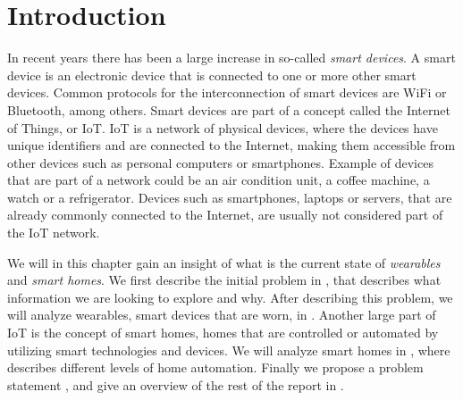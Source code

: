 \chapter{Introduction}\label{chap:introduction}
In recent years there has been a large increase in so-called \emph{smart devices}. 
A smart device is an electronic device that is connected to one or more other smart devices. 
Common protocols for the interconnection of smart devices are WiFi or Bluetooth, among others.
Smart devices are part of a concept called the Internet of Things, or IoT. 
IoT is a network of physical devices, 
where the devices have unique identifiers and are connected to the Internet, 
making them accessible from other devices such as personal computers or smartphones. 
Example of devices that are part of a network could be an air condition unit, a coffee machine, a watch or a refrigerator. 
Devices such as smartphones, laptops or servers, 
that are already commonly connected to the Internet, 
are usually not considered part of the IoT network. 

We will in this chapter gain an insight of what is the current state of \emph{wearables} and \emph{smart homes}. 
We first describe the initial problem in , 
that describes what information we are looking to explore and why. 
After describing this problem, we will analyze wearables, 
\ie smart devices that are worn, in .
Another large part of IoT is the concept of smart homes, 
\ie homes that are controlled or automated by utilizing smart technologies and devices. 
We will analyze smart homes in , 
where  describes different levels of home automation. 
Finally we propose a problem statement , 
and give an overview of the rest of the report in .











